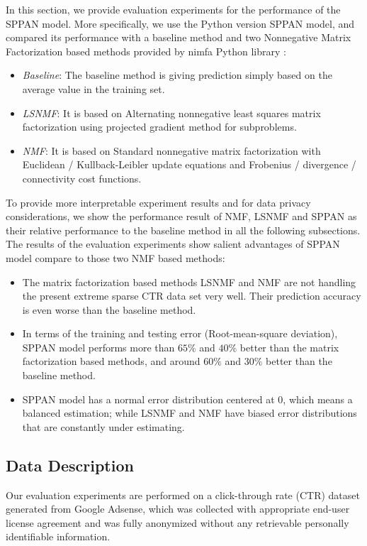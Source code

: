 \documentclass[conference,compsoc]{IEEEtran}
\begin{document}
In this section, we provide evaluation experiments for the performance of the SPPAN model. More specifically, we use the Python version SPPAN model, and compared its performance with a baseline method and two Nonnegative Matrix Factorization based methods provided by nimfa Python library \cite{ZitnikZ12}:

\begin{itemize} \itemsep -2pt
\item {\em Baseline}: The baseline method is giving prediction simply based on the average value in the training set.
\item {\em LSNMF}: It is based on Alternating nonnegative least squares matrix factorization using projected gradient method for subproblems\cite{lin2007projected}.
\item {\em NMF}: It is based on Standard nonnegative matrix factorization with Euclidean / Kullback-Leibler update equations and Frobenius / divergence / connectivity cost functions\cite{lee2001algorithms, brunet2004metagenes}.
\end{itemize}

To provide more interpretable experiment results and for data privacy considerations, we show the performance result of NMF, LSNMF and SPPAN as their relative  performance to the baseline method in all the following subsections. The results of the evaluation experiments show salient advantages of SPPAN model compare to those two NMF based methods:

\begin{itemize} \itemsep -2pt
\item {} The matrix factorization based methods LSNMF and NMF are not handling the present extreme sparse CTR data set very well. Their prediction accuracy is even worse than the baseline method.

\item {} In terms of the training and testing error (Root-mean-square deviation), SPPAN model performs more than $65\%$ and $40\%$ better than the matrix factorization based methods, and around $60\%$ and $30\%$ better than the baseline method.

\item {} SPPAN model has a normal error distribution centered at 0, which means a balanced estimation; while LSNMF and NMF have biased error distributions that are constantly under estimating.

\end{itemize}


\subsection{Data Description}
\label{sec:data_desc}
Our evaluation experiments are performed on a click-through rate (CTR) dataset generated from Google Adsense, which was collected with appropriate end-user license agreement and was fully anonymized without any retrievable personally identifiable information. 
\end{document}
